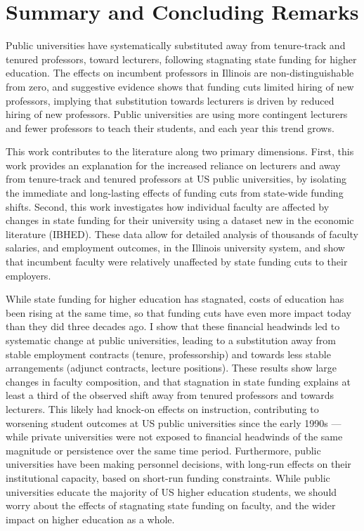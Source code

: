 \section{Summary and Concluding Remarks}
\label{sec:conclusion}
Public universities have systematically substituted away from tenure-track and tenured professors, toward lecturers, following stagnating state funding for higher education.
The effects on incumbent professors in Illinois are non-distinguishable from zero, and suggestive evidence shows that funding cuts limited hiring of new professors, implying that substitution towards lecturers is driven by reduced hiring of new professors.
Public universities are using more contingent lecturers and fewer professors to teach their students, and each year this trend grows.

This work contributes to the literature along two primary dimensions.
First, this work provides an explanation for the increased reliance on lecturers and away from tenure-track and tenured professors at US public universities, by isolating the immediate and long-lasting effects of funding cuts from state-wide funding shifts.
Second, this work investigates how individual faculty are affected by changes in state funding for their university using a dataset new in the economic literature (IBHED).
These data allow for detailed analysis of thousands of faculty salaries, and employment outcomes, in the Illinois university system, and show that incumbent faculty were relatively unaffected by state funding cuts to their employers.

While state funding for higher education has stagnated, costs of education has been rising at the same time, so that funding cuts have even more impact today than they did three decades ago.
I show that these financial headwinds led to systematic change at public universities, leading to a substitution away from stable employment contracts (tenure, professorship) and towards less stable arrangements (adjunct contracts, lecture positions).
These results show large changes in faculty composition, and that stagnation in state funding explains at least a third of the observed shift away from tenured professors and towards lecturers.
This likely had knock-on effects on instruction, contributing to worsening student outcomes at US public universities since the early 1990s --- while private universities were not exposed to financial headwinds of the same magnitude or persistence over the same time period.
Furthermore, public universities have been making personnel decisions, with long-run effects on their institutional capacity, based on short-run funding constraints.
While public universities educate the majority of US higher education students, we should worry about the effects of stagnating state funding on faculty, and the wider impact on higher education as a whole.
